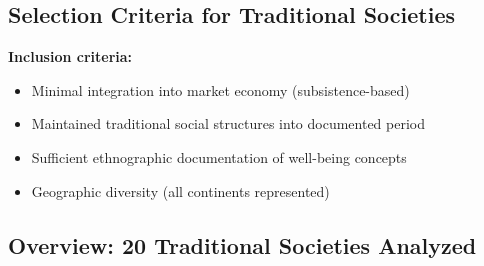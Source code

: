 \subsection{Selection Criteria for Traditional Societies}

\textbf{Inclusion criteria:}
\begin{itemize}[nosep]
\item Minimal integration into market economy (subsistence-based)
\item Maintained traditional social structures into documented period
\item Sufficient ethnographic documentation of well-being concepts
\item Geographic diversity (all continents represented)
\end{itemize}

\subsection{Overview: 20 Traditional Societies Analyzed}

